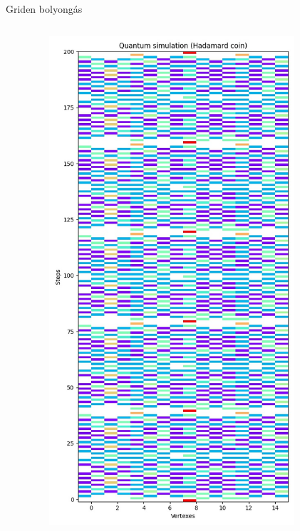 \documentclass[aspectratio=169]{beamer}
\begin{document}
\begin{frame}{Griden bolyongás}
\begin{columns}[onlytextwidth]
    \begin{column}{.08\textwidth}
    \end{column}
    \begin{column}{.23\textwidth}
      \begin{figure}
        \includegraphics[width=0.9\textwidth]{./tdk_figures/results/grid/hadamard.jpg}
      \end{figure}
    \end{column}
     \begin{column}{.23\textwidth}

\end{column}
\end{columns}
\end{frame}
\end{document}
